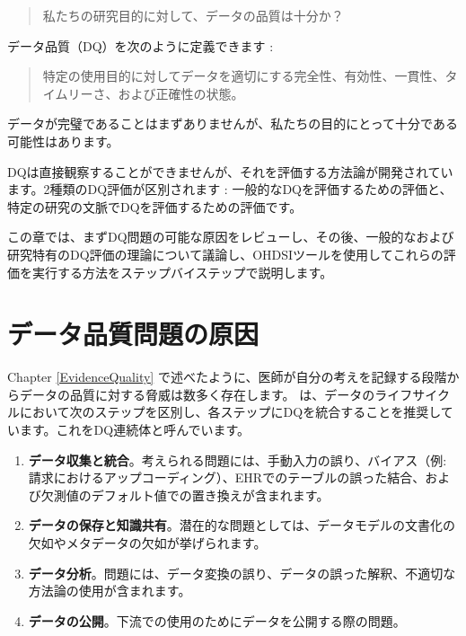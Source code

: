 \documentclass[
  11pt]{book}
\providecommand{\tightlist}{%
  \setlength{\itemsep}{0pt}\setlength{\parskip}{0pt}}
\theoremstyle{definition}
\theoremstyle{definition}
\theoremstyle{definition}
\theoremstyle{definition}
\theoremstyle{remark}
\begin{document}
\begin{quote}
私たちの研究目的に対して、データの品質は十分か？
\end{quote}

データ品質（DQ）を次のように定義できます \citep{roebuck_2012}: 

\begin{quote}
特定の使用目的に対してデータを適切にする完全性、有効性、一貫性、タイムリーさ、および正確性の状態。
\end{quote}

データが完璧であることはまずありませんが、私たちの目的にとって十分である可能性はあります。

DQは直接観察することができませんが、それを評価する方法論が開発されています。2種類のDQ評価が区別されます \citep{weiskopf_2013}: 一般的なDQを評価するための評価と、特定の研究の文脈でDQを評価するための評価です。

この章では、まずDQ問題の可能な原因をレビューし、その後、一般的なおよび研究特有のDQ評価の理論について議論し、OHDSIツールを使用してこれらの評価を実行する方法をステップバイステップで説明します。

\section{データ品質問題の原因}\label{ux30c7ux30fcux30bfux54c1ux8ceaux554fux984cux306eux539fux56e0}

Chapter \ref{EvidenceQuality} で述べたように、医師が自分の考えを記録する段階からデータの品質に対する脅威は数多く存在します。\citet{dasu_2003} は、データのライフサイクルにおいて次のステップを区別し、各ステップにDQを統合することを推奨しています。これをDQ連続体と呼んでいます。

\begin{enumerate}
\def\labelenumi{\arabic{enumi}.}
\tightlist
\item
  \textbf{データ収集と統合}。考えられる問題には、手動入力の誤り、バイアス（例: 請求におけるアップコーディング）、EHRでのテーブルの誤った結合、および欠測値のデフォルト値での置き換えが含まれます。
\item
  \textbf{データの保存と知識共有}。潜在的な問題としては、データモデルの文書化の欠如やメタデータの欠如が挙げられます。
\item
  \textbf{データ分析}。問題には、データ変換の誤り、データの誤った解釈、不適切な方法論の使用が含まれます。
\item
  \textbf{データの公開}。下流での使用のためにデータを公開する際の問題。
\end{enumerate}
\end{document}
